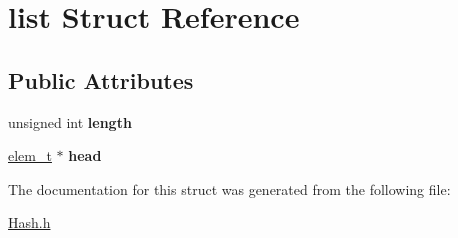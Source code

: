 \hypertarget{structlist}{\section{list Struct Reference}
\label{structlist}
}
\subsection*{Public Attributes}
\begin{DoxyCompactItemize}
\item 
\hypertarget{structlist_a21ce8a36f8292e42468b9dba9a81931f}{unsigned int {\bfseries length}}\label{structlist_a21ce8a36f8292e42468b9dba9a81931f}

\item 
\hypertarget{structlist_ad79adb71feb2412ec572f18ce4519fe5}{\hyperlink{structelem}{elem\-\_\-t} $\ast$ {\bfseries head}}\label{structlist_ad79adb71feb2412ec572f18ce4519fe5}

\end{DoxyCompactItemize}


The documentation for this struct was generated from the following file\-:\begin{DoxyCompactItemize}
\item 
\hyperlink{Hash_8h}{Hash.\-h}\end{DoxyCompactItemize}
